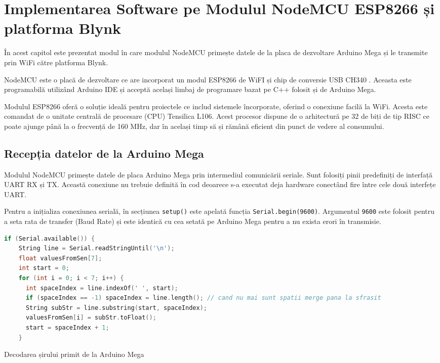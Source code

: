 \chapter{Implementarea Software pe Modulul NodeMCU ESP8266 și platforma Blynk}
\thispagestyle{pagestyle}

În acest capitol este prezentat modul în care modulul NodeMCU primește datele de la placa de dezvoltare Arduino Mega și le transmite prin WiFi către platforma Blynk.

NodeMCU este o placă de dezvoltare ce are incorporat un modul ESP8266 de WiFI și chip de conversie USB CH340 \cite{nodemcu_ard}. Aceasta este programabilă utilizând Arduino IDE și acceptă același limbaj de programare bazat pe C++ folosit și de Arduino Mega.

Modulul ESP8266 oferă o soluție ideală pentru proiectele ce includ sistemele încorporate, oferind o conexiune facilă la WiFi. Acesta este comandat de o unitate centrală de procesare (CPU) Tensilica L106. Acest procesor dispune de o arhitectură pe 32 de biți de tip RISC ce poate ajunge până la o frecvență de 160 MHz, dar în același timp să și rămână eficient din punct de vedere al consumului\cite{nodemcu_datasheet}.

\section{Recepția datelor de la Arduino Mega}

Modulul NodeMCU primește datele de placa Arduino Mega prin intermediul comunicării seriale. Sunt folosiți pinii predefiniți de interfață UART
RX și TX. Această conexiune nu trebuie definită în cod deoarece s-a executat deja hardware conectând fire între cele două interfețe UART.

Pentru a inițializa conexiunea serială, în secțiunea \texttt{setup()} este apelată funcția \texttt{Serial.begin(9600)}. Argumentul \texttt{9600} este folosit pentru a seta rata de transfer (Baud Rate) și este identică cu cea setată pe Arduino Mega pentru a nu exista erori în transmisie.

\begin{code}[H]
\begin{lstlisting}[language=C++]
if (Serial.available()) {
    String line = Serial.readStringUntil('\n');
    float valuesFromSen[7]; 
    int start = 0;
    for (int i = 0; i < 7; i++) {
      int spaceIndex = line.indexOf(' ', start);
      if (spaceIndex == -1) spaceIndex = line.length(); // cand nu mai sunt spatii merge pana la sfrasit
      String subStr = line.substring(start, spaceIndex);
      valuesFromSen[i] = subStr.toFloat();
      start = spaceIndex + 1;
    }
\end{lstlisting}
\caption{Decodarea șirului primit de la Arduino Mega}
\label{code:decode_data_esp}
\end{code}

